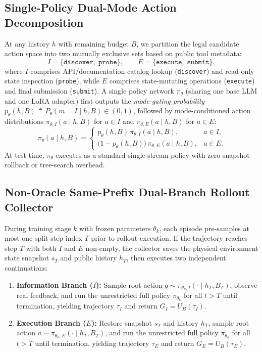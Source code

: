 \documentclass[11pt]{article}
\theoremstyle{definition}
\theoremstyle{remark}
\newcommand{\UB}{U_B}
\begin{document}
\subsection{Single-Policy Dual-Mode Action Decomposition}
\label{subsec:dual_mode}
At any history $h$ with remaining budget $B$, we partition the legal candidate action space into two mutually exclusive sets based on public tool metadata:
\begin{equation}
    I = \{\texttt{discover},\; \texttt{probe}\}, \qquad E = \{\texttt{execute},\; \texttt{submit}\},
\end{equation}
where $I$ comprises API/documentation catalog lookup (\texttt{discover}) and read-only state inspection (\texttt{probe}), while $E$ comprises state-mutating operations (\texttt{execute}) and final submission (\texttt{submit}).
A single policy network $\pi_\theta$ (sharing one base LLM and one LoRA adapter) first outputs the \emph{mode-gating probability} $p_\theta(h, B) \triangleq P_\theta(m = I \mid h, B) \in (0, 1)$, followed by mode-conditioned action distributions $\pi_{\theta, I}(a \mid h, B)$ for $a \in I$ and $\pi_{\theta, E}(a \mid h, B)$ for $a \in E$:
\begin{equation}
    \pi_\theta(a \mid h, B) = \begin{cases}
        p_\theta(h, B)\,\pi_{\theta, I}(a \mid h, B), & a \in I, \\[4pt]
        \bigl(1 - p_\theta(h, B)\bigr)\,\pi_{\theta, E}(a \mid h, B), & a \in E.
    \end{cases}
    \label{eq:policy_decomp}
\end{equation}
At test time, $\pi_\theta$ executes as a standard single-stream policy with zero snapshot rollback or tree-search overhead.

\subsection{Non-Oracle Same-Prefix Dual-Branch Rollout Collector}
\label{subsec:collector}
During training stage $k$ with frozen parameters $\theta_k$, each episode pre-samples at most one split step index $T$ prior to rollout execution. If the trajectory reaches step $T$ with both $I$ and $E$ non-empty, the collector saves the physical environment state snapshot $s_T$ and public history $h_T$, then executes two independent continuations:
\begin{enumerate}[leftmargin=*, nosep, topsep=2pt]
    \item \textbf{Information Branch ($I$):} Sample root action $q \sim \pi_{\theta_k, I}(\cdot \mid h_T, B_T)$, observe real feedback, and run the unrestricted full policy $\pi_{\theta_k}$ for all $t > T$ until termination, yielding trajectory $\tau_I$ and return $G_I = \UB(\tau_I)$.
    \item \textbf{Execution Branch ($E$):} Restore snapshot $s_T$ and history $h_T$, sample root action $a \sim \pi_{\theta_k, E}(\cdot \mid h_T, B_T)$, and run the unrestricted full policy $\pi_{\theta_k}$ for all $t > T$ until termination, yielding trajectory $\tau_E$ and return $G_E = \UB(\tau_E)$.
\end{enumerate}
\end{document}
